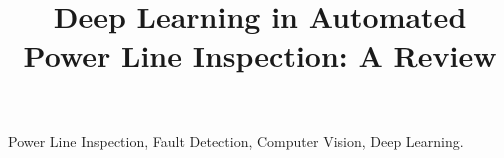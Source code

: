 \documentclass[3p]{elsarticle}
\begin{document}
\begin{frontmatter}

\title{Deep Learning in Automated Power Line Inspection: A Review}







\begin{keyword}
    Power Line Inspection, Fault Detection, Computer Vision, Deep Learning.
\end{keyword}

\end{frontmatter}















\appendix


 

\end{document}
